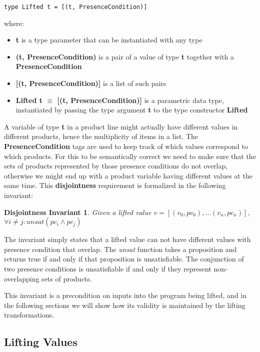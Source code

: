 \documentclass[11pt]{article} %
\begin{document}
\begin{verbatim}
type Lifted t = [(t, PresenceCondition)]
\end{verbatim}

where:
\begin{itemize}
\item \textbf{t} is a type parameter that can be instantiated with any type
\item \textbf{(t, PresenceCondition)} is a pair of a value of type \textbf{t} together with a \textbf{PresenceCondition}
\item \textbf{[(t, PresenceCondition)]} is a list of such pairs
\item \textbf{Lifted t $\equiv$ [(t, PresenceCondition)]} is a parametric data type, instantiated by passing the type argument \textbf{t} to the type constructor \textbf{Lifted}
\end{itemize}

A variable of type \textbf{t} in a product line might actually have different values in different products, hence the multiplicity of items in a list. The \textbf{PresenceCondition} tags are used to keep track of which values correspond to which products. For this to be semantically correct we need to make sure that the sets of products represented by those presence conditions do not overlap, otherwise we might end up with a product variable having different values at the same time. This \textbf{disjointness} requirement is formalized in the following invariant:

\newtheorem*{disjInv*}{Disjointness Invariant}
\begin{disjInv*}
Given a lifted value $v = [(v_0, pc_0), ... (v_n, pc_n)]$, $\forall i \neq j: {unsat (pc_i \wedge pc_j)}$
\end{disjInv*}

The invariant simply states that a lifted value can not have different values with presence condition that overlap. The \emph{unsat} function takes a proposition and returns true if and only if that proposition is unsatisfiable. The conjunction of two presence conditions is unsatisfiable if and only if they represent non-overlapping sets of products.

This invariant is a precondition on inputs into the program being lifted, and in the following sections we will show how its validity is maintained by the lifting transformations.

\subsection{Lifting Values}
\end{document}
